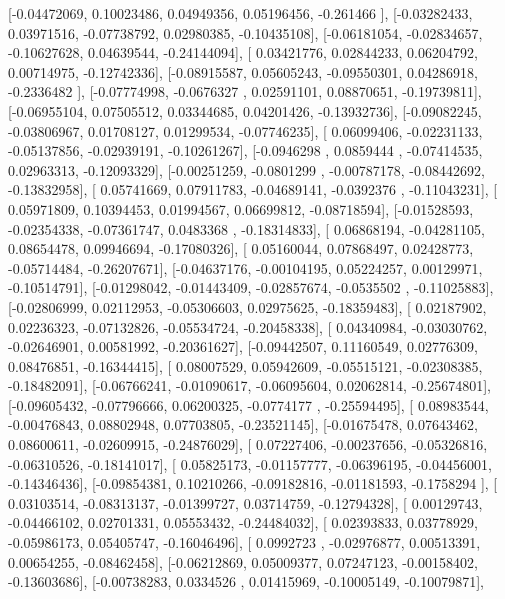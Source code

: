 \documentclass{article}
\begin{document}
       [-0.04472069,  0.10023486,  0.04949356,  0.05196456, -0.261466  ],
       [-0.03282433,  0.03971516, -0.07738792,  0.02980385, -0.10435108],
       [-0.06181054, -0.02834657, -0.10627628,  0.04639544, -0.24144094],
       [ 0.03421776,  0.02844233,  0.06204792,  0.00714975, -0.12742336],
       [-0.08915587,  0.05605243, -0.09550301,  0.04286918, -0.2336482 ],
       [-0.07774998, -0.0676327 ,  0.02591101,  0.08870651, -0.19739811],
       [-0.06955104,  0.07505512,  0.03344685,  0.04201426, -0.13932736],
       [-0.09082245, -0.03806967,  0.01708127,  0.01299534, -0.07746235],
       [ 0.06099406, -0.02231133, -0.05137856, -0.02939191, -0.10261267],
       [-0.0946298 ,  0.0859444 , -0.07414535,  0.02963313, -0.12093329],
       [-0.00251259, -0.0801299 , -0.00787178, -0.08442692, -0.13832958],
       [ 0.05741669,  0.07911783, -0.04689141, -0.0392376 , -0.11043231],
       [ 0.05971809,  0.10394453,  0.01994567,  0.06699812, -0.08718594],
       [-0.01528593, -0.02354338, -0.07361747,  0.0483368 , -0.18314833],
       [ 0.06868194, -0.04281105,  0.08654478,  0.09946694, -0.17080326],
       [ 0.05160044,  0.07868497,  0.02428773, -0.05714484, -0.26207671],
       [-0.04637176, -0.00104195,  0.05224257,  0.00129971, -0.10514791],
       [-0.01298042, -0.01443409, -0.02857674, -0.0535502 , -0.11025883],
       [-0.02806999,  0.02112953, -0.05306603,  0.02975625, -0.18359483],
       [ 0.02187902,  0.02236323, -0.07132826, -0.05534724, -0.20458338],
       [ 0.04340984, -0.03030762, -0.02646901,  0.00581992, -0.20361627],
       [-0.09442507,  0.11160549,  0.02776309,  0.08476851, -0.16344415],
       [ 0.08007529,  0.05942609, -0.05515121, -0.02308385, -0.18482091],
       [-0.06766241, -0.01090617, -0.06095604,  0.02062814, -0.25674801],
       [-0.09605432, -0.07796666,  0.06200325, -0.0774177 , -0.25594495],
       [ 0.08983544, -0.00476843,  0.08802948,  0.07703805, -0.23521145],
       [-0.01675478,  0.07643462,  0.08600611, -0.02609915, -0.24876029],
       [ 0.07227406, -0.00237656, -0.05326816, -0.06310526, -0.18141017],
       [ 0.05825173, -0.01157777, -0.06396195, -0.04456001, -0.14346436],
       [-0.09854381,  0.10210266, -0.09182816, -0.01181593, -0.1758294 ],
       [ 0.03103514, -0.08313137, -0.01399727,  0.03714759, -0.12794328],
       [ 0.00129743, -0.04466102,  0.02701331,  0.05553432, -0.24484032],
       [ 0.02393833,  0.03778929, -0.05986173,  0.05405747, -0.16046496],
       [ 0.0992723 , -0.02976877,  0.00513391,  0.00654255, -0.08462458],
       [-0.06212869,  0.05009377,  0.07247123, -0.00158402, -0.13603686],
       [-0.00738283,  0.0334526 ,  0.01415969, -0.10005149, -0.10079871],
\end{document}
